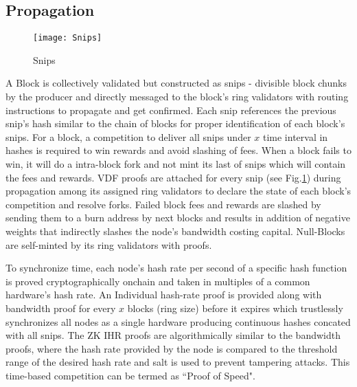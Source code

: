 \documentclass[../Bitcoin Blink.tex]{subfiles}
\begin{document}
\subsection{Propagation}
\begin{figure}[h]
\begin{center}
\texttt{[image: Snips]}
\caption{Snips}
\label{snips}
\end{center}
\end{figure}
A Block is collectively validated but constructed as snips - divisible block chunks by the producer and directly messaged to the block's ring validators with routing instructions to propagate and get confirmed. Each snip references the previous snip's hash similar to the chain of blocks for proper identification of each block's snips. For a block, a competition to deliver all snips under $x$ time interval in hashes is required to win rewards and avoid slashing of fees. When a block fails to win, it will do a intra-block fork and not mint its last of snips which will contain the fees and rewards. VDF proofs are attached for every snip (see Fig.\ref{snips}) during propagation among its assigned ring validators to declare the state of each block's competition and resolve forks. Failed block fees and rewards are slashed by sending them to a burn address by next blocks and results in addition of negative weights that indirectly slashes the node's bandwidth costing capital. Null-Blocks are self-minted by its ring validators with proofs.

To synchronize time, each node's hash rate per second of a specific hash function is proved cryptographically onchain and taken in multiples of a common hardware's hash rate. An Individual hash-rate proof is provided along with bandwidth proof for every $x$ blocks (ring size) before it expires which trustlessly synchronizes all nodes as a single hardware producing continuous hashes concated with all snips. The ZK IHR proofs are algorithmically similar to the bandwidth proofs, where the hash rate provided by the node is compared to the threshold range of the desired hash rate and salt is used to prevent tampering attacks. This time-based competition can be termed as ``Proof of Speed".
\end{document}
